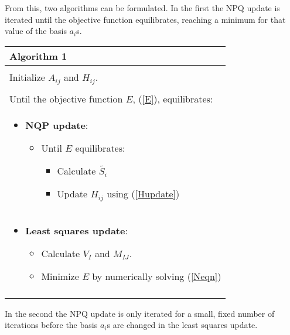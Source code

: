 \documentclass[11pt,twocolumn]{IEEEtran}
\begin{document}
From this, two algorithms can be formulated. In the first the NPQ update is iterated until the objective function equilibrates, reaching a minimum for that value of the basis $a_i$s.\\
\begin{tabular}{p{8.25cm}}
\\
{\bf Algorithm 1}\\
\hline\\
Initialize $A_{ij}$ and $H_{ij}$.\\
\\
Until the objective function $E$, (\ref{E}), equilibrates:\\ 
\begin{itemize}
\item[] {\bf NQP update}: 
\begin{itemize}
\item[] Until $E$ equilibrates:
\begin{itemize}
\item[] Calculate $\tilde{S_i}$
\item[] Update $H_{ij}$ using (\ref{Hupdate})
\end{itemize}
\end{itemize}
\end{itemize}
\\
\begin{itemize}
\item[] {\bf Least squares update}: 
\begin{itemize}
\item[] Calculate $V_I$ and $M_{IJ}$.
\item[] Minimize $E$ by numerically solving (\ref{Neqn})
\end{itemize}
\end{itemize}\\
\hline\\
\end{tabular}
In the second the NPQ update is only iterated for a small, fixed number of iterations before the basis $a_i$s are changed in the least squares update.\\
\end{document}
